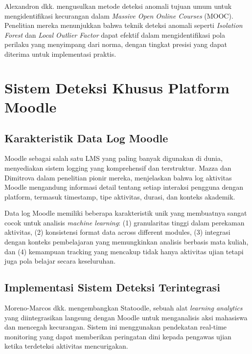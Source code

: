 Alexandron dkk. \cite{Alexandron2019} mengusulkan metode deteksi anomali tujuan umum untuk mengidentifikasi kecurangan dalam \textit{Massive Open Online Courses} (MOOC). Penelitian mereka menunjukkan bahwa teknik deteksi anomali seperti \textit{Isolation Forest} dan \textit{Local Outlier Factor} dapat efektif dalam mengidentifikasi pola perilaku yang menyimpang dari norma, dengan tingkat presisi yang dapat diterima untuk implementasi praktis.

\section{Sistem Deteksi Khusus Platform Moodle}
\label{sec:moodleSpecific}

\subsection{Karakteristik Data Log Moodle}

Moodle sebagai salah satu LMS yang paling banyak digunakan di dunia, menyediakan sistem logging yang komprehensif dan terstruktur. Mazza dan Dimitrova \cite{article:moodle_logs} dalam penelitian pionir mereka, menjelaskan bahwa log aktivitas Moodle mengandung informasi detail tentang setiap interaksi pengguna dengan platform, termasuk timestamp, tipe aktivitas, durasi, dan konteks akademik.

Data log Moodle memiliki beberapa karakteristik unik yang membuatnya sangat cocok untuk analisis \textit{machine learning}: (1) granularitas tinggi dalam perekaman aktivitas, (2) konsistensi format data across different modules, (3) integrasi dengan konteks pembelajaran yang memungkinkan analisis berbasis mata kuliah, dan (4) kemampuan tracking yang mencakup tidak hanya aktivitas ujian tetapi juga pola belajar secara keseluruhan.

\subsection{Implementasi Sistem Deteksi Terintegrasi}

Moreno-Marcos dkk. \cite{MorenoMarcos2023} mengembangkan Statoodle, sebuah alat \textit{learning analytics} yang diintegrasikan langsung dengan Moodle untuk menganalisis aksi mahasiswa dan mencegah kecurangan. Sistem ini menggunakan pendekatan real-time monitoring yang dapat memberikan peringatan dini kepada pengawas ujian ketika terdeteksi aktivitas mencurigakan.

